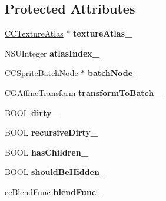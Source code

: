 \subsection*{Protected Attributes}
\begin{DoxyCompactItemize}
\item 
\hypertarget{class_c_c_sprite_a3d4d053e1d2eebe0391920294f308d30}{\hyperlink{interface_c_c_texture_atlas}{C\-C\-Texture\-Atlas} $\ast$ {\bfseries texture\-Atlas\-\_\-}}\label{class_c_c_sprite_a3d4d053e1d2eebe0391920294f308d30}

\item 
\hypertarget{class_c_c_sprite_a0146b0f3986164e8b702e28cb522b4f7}{N\-S\-U\-Integer {\bfseries atlas\-Index\-\_\-}}\label{class_c_c_sprite_a0146b0f3986164e8b702e28cb522b4f7}

\item 
\hypertarget{class_c_c_sprite_a743881812c39f73fb689b96ce4c20b2c}{\hyperlink{interface_c_c_sprite_batch_node}{C\-C\-Sprite\-Batch\-Node} $\ast$ {\bfseries batch\-Node\-\_\-}}\label{class_c_c_sprite_a743881812c39f73fb689b96ce4c20b2c}

\item 
\hypertarget{class_c_c_sprite_adad33bdd0c0d19e222251f45267ae5aa}{C\-G\-Affine\-Transform {\bfseries transform\-To\-Batch\-\_\-}}\label{class_c_c_sprite_adad33bdd0c0d19e222251f45267ae5aa}

\item 
\hypertarget{class_c_c_sprite_a0bdacef17eb6b4684ba8ef1418c7a403}{B\-O\-O\-L {\bfseries dirty\-\_\-}}\label{class_c_c_sprite_a0bdacef17eb6b4684ba8ef1418c7a403}

\item 
\hypertarget{class_c_c_sprite_a08582ff2057eaf1ba780b1fe7c0b52cf}{B\-O\-O\-L {\bfseries recursive\-Dirty\-\_\-}}\label{class_c_c_sprite_a08582ff2057eaf1ba780b1fe7c0b52cf}

\item 
\hypertarget{class_c_c_sprite_a2780bb1bd8390240a412df32a4846546}{B\-O\-O\-L {\bfseries has\-Children\-\_\-}}\label{class_c_c_sprite_a2780bb1bd8390240a412df32a4846546}

\item 
\hypertarget{class_c_c_sprite_a6302b8509576aa02f1db66a8d5cf3453}{B\-O\-O\-L {\bfseries should\-Be\-Hidden\-\_\-}}\label{class_c_c_sprite_a6302b8509576aa02f1db66a8d5cf3453}

\item 
\hypertarget{class_c_c_sprite_aa861a80c1c5bae537f89a0b7ecea375a}{\hyperlink{cc_types_8h_a8c19c6f67219ecc0a6e4740cc046008d}{cc\-Blend\-Func} {\bfseries blend\-Func\-\_\-}}\label{class_c_c_sprite_aa861a80c1c5bae537f89a0b7ecea375a}


\end{DoxyCompactItemize}

